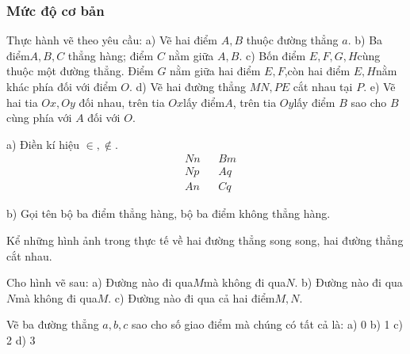 \subsubsection*{Mức độ cơ bản}
\begin{bt}
	Thực hành vẽ theo yêu cầu:
	a) Vẽ hai điểm $A,B$ thuộc đường thẳng $a$.
	b) Ba điểm$A,B,C$ thẳng hàng; điểm $C$ nằm giữa $A,B$.
	c) Bốn điểm $E,F,G,H$cùng thuộc một đường thẳng. Điểm $G$ nằm giữa hai điểm $E,F$,còn hai điểm $E,H$nằm khác phía đối với điểm $O.$
	d) Vẽ hai đường thẳng $MN,PE$ cắt nhau tại $P$.
	e) Vẽ hai tia $Ox,Oy$ đối nhau, trên tia $Ox$lấy điểm$A$, trên tia $Oy$lấy điểm $B$ sao cho $B$ cùng phía với $A$ đối với $O$.
	\begin{loigiaichuong}
		
	\end{loigiaichuong}
\end{bt}
\begin{bt}
	a) Điền kí hiệu $\in ,\notin .$
	\begin{align*}
		&N n && B m\\
		&N p && A q\\
		&A n && C q
	\end{align*}
	\begin{center}
		\begin{tikzpicture}
			
		\end{tikzpicture}
	\end{center}
	b) Gọi tên bộ ba điểm thẳng hàng, bộ ba điểm không thẳng hàng.
	\begin{loigiaichuong}
		
	\end{loigiaichuong}
\end{bt}
\begin{bt}
	Kể những hình ảnh trong thực tế về hai đường thẳng song song, hai đường thẳng cắt nhau.
	\begin{loigiaichuong}
		
	\end{loigiaichuong}
\end{bt}
\begin{bt}
	Cho hình vẽ sau: 
	a) Đường nào đi qua$M$mà không đi qua$N$.
	b) Đường nào đi qua$N$mà không đi qua$M$.
	c) Đường nào đi qua cả hai điểm$M,N$.
	\begin{loigiaichuong}
		
	\end{loigiaichuong}
\end{bt}
\begin{bt}
	Vẽ ba đường thẳng $a,b,c$ sao cho số giao điểm mà chúng có tất cả là:
	a) 0	b) 1	c) 2	d) 3
	\begin{loigiaichuong}
		
	\end{loigiaichuong}
\end{bt}
